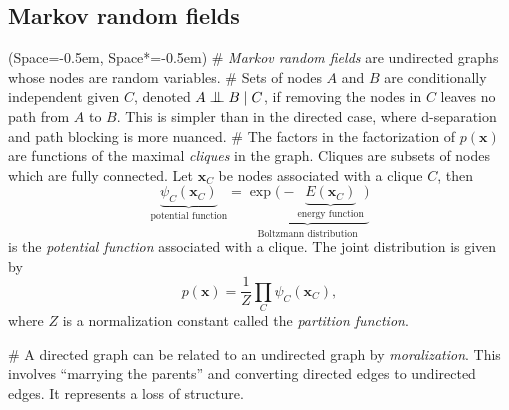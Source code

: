 \documentclass[12pt, a4paper]{article}
\newcommand{\listSpace}{-0.5em}%
\newcommand{\vect}[1]{\bm{#1}}
\newcommand{\bigCI}{\mathrel{\text{\scalebox{1.07}{$\perp\mkern-10mu\perp$}}}}
\begin{document}
\subsection*{Markov random fields}
\begin{easylist}[itemize]
	\ListProperties(Space=\listSpace, Space*=\listSpace)
	# \emph{Markov random fields} are undirected graphs whose nodes are random variables.
	# Sets of nodes $A$ and $B$ are conditionally independent given $C$, denoted $A \bigCI B \mid C$, if removing the nodes in $C$ leaves no path from $A$ to $B$.
	This is simpler than in the directed case, where d-separation and path blocking is more nuanced. 
	# The factors in the factorization of $p(\vect{x})$ are functions of the maximal \emph{cliques} in the graph.
	Cliques are subsets of nodes which are fully connected.
	Let $\vect{x}_C$ be nodes associated with a clique $C$, then
	\begin{equation*}
		\underbrace{\psi_C (\vect{x}_C)}_{\text{potential function}} = \underbrace{ \exp \big(- \underbrace{E(\vect{x}_C)}_{\text{energy function}} \big)}_{\text{Boltzmann distribution}}
	\end{equation*}
	is the \emph{potential function} associated with a clique.
	The joint distribution is given by
	\begin{equation*}
		p(\vect{x}) = \frac{1}{Z} \prod_{C} \psi_C (\vect{x}_C),
	\end{equation*}
	where $Z$ is a normalization constant called the \emph{partition function}.
	
	# A directed graph can be related to an undirected graph by \emph{moralization}.
	This involves ``marrying the parents'' and converting directed edges to undirected edges. 
	It represents a loss of structure.
\end{easylist}
\end{document}
